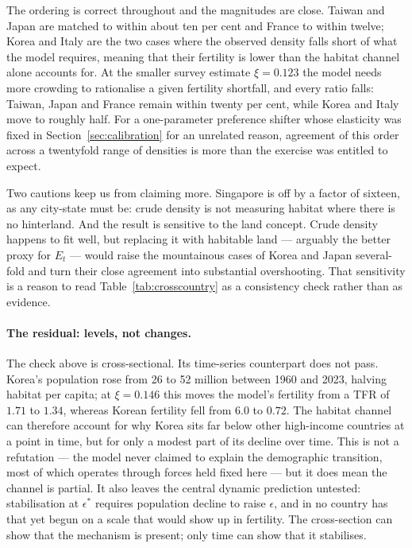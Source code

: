 \documentclass[11pt]{article}
\begin{document}
The ordering is correct throughout and the magnitudes are close. Taiwan and Japan are matched to
within about ten per cent and France to within twelve; Korea and Italy are the two cases where the
observed density falls short of what the model requires, meaning that their fertility is lower than
the habitat channel alone accounts for. At the smaller survey estimate $\xi=0.123$ the model needs
more crowding to rationalise a given fertility shortfall, and every ratio falls: Taiwan, Japan and
France remain within twenty per cent, while Korea and Italy move to roughly half. For a one-parameter preference shifter whose elasticity was
fixed in Section~\ref{sec:calibration} for an unrelated reason, agreement of this order across a
twentyfold range of densities is more than the exercise was entitled to expect.

Two cautions keep us from claiming more. Singapore is off by a factor of sixteen, as any city-state
must be: crude density is not measuring habitat where there is no hinterland. And the result is
sensitive to the land concept. Crude density happens to fit well, but replacing it with habitable
land --- arguably the better proxy for $E_t$ --- would raise the mountainous cases of Korea and Japan
several-fold and turn their close agreement into substantial overshooting. That sensitivity is a
reason to read Table~\ref{tab:crosscountry} as a consistency check rather than as evidence.

\paragraph{The residual: levels, not changes.}
The check above is cross-sectional. Its time-series counterpart does not pass. Korea's
population rose from 26 to 52 million between 1960 and 2023, halving habitat per capita; at
$\xi=0.146$ this moves the model's fertility from a TFR of $1.71$ to $1.34$, whereas Korean
fertility fell from $6.0$ to
$0.72$. The habitat channel can therefore account for why Korea sits far below other high-income
countries at a point in time, but for only a modest part of its decline over time. This is not a
refutation --- the model never claimed to explain the demographic transition, most of which operates
through forces held fixed here --- but it does mean the channel is partial. It also leaves the
central dynamic prediction untested: stabilisation at $\epsilon^{\ast}$ requires population decline
to raise $\epsilon$, and in no country has that yet begun on a scale that would show up in fertility.
The cross-section can show that the mechanism is present; only time can show that it stabilises.
\end{document}
